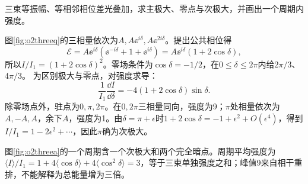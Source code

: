 \begin{example}\label{ex:o2three}
三束等振幅、等相邻相位差光叠加，求主极大、零点与次极大，并画出一个周期内强度。
\end{example}
\begin{solution}
图\ref{fig:o2threeq}的三相量依次为$A,A\ee^{i\delta},A\ee^{2i\delta}$。提出公共相位得
\[
 \mathcal E=A\ee^{i\delta}(\ee^{-i\delta}+1+\ee^{i\delta})
 =A\ee^{i\delta}(1+2\cos\delta),
\]
所以$I/I_1=(1+2\cos\delta)^2$。零场条件为$\cos\delta=-1/2$，在$0\leq\delta\leq2\pi$内给$2\pi/3$、$4\pi/3$。
为区别极大与零点，对强度求导：
\[
 \frac1{I_1}\frac{\dd I}{\dd\delta}
 =-4(1+2\cos\delta)\sin\delta.
\]
除零场点外，驻点为$0,\pi,2\pi$。在$0,2\pi$三相量同向，强度为9；$\pi$处相量依次为$A,-A,A$，余下$A$，强度为1。由$\delta=\pi+\epsilon$时$1+2\cos\delta=-1+\epsilon^2+O(\epsilon^4)$，得到$I/I_1=1-2\epsilon^2+\cdots$，因此$\pi$确为次极大。

图\ref{fig:o2threea}的一个周期含一个次极大和两个完全暗点。周期平均强度为$\langle I\rangle/I_1=1+4\langle\cos\delta\rangle+4\langle\cos^2\delta\rangle=3$，等于三束单独强度之和；峰值9来自相干重排，不能解释为总能量增为三倍。
\end{solution}

